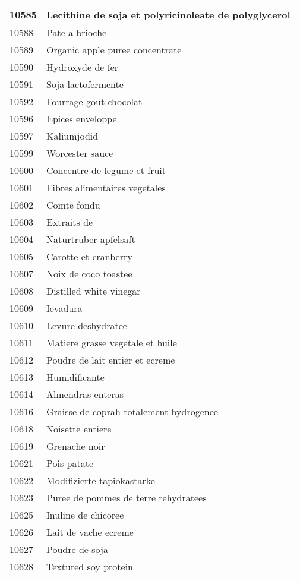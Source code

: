 \begin{longtable}{|l|l|}
10585 & Lecithine de soja et polyricinoleate de polyglycerol \\ \hline 
10588 & Pate a brioche \\ \hline 
10589 & Organic apple puree concentrate \\ \hline 
10590 & Hydroxyde de fer \\ \hline 
10591 & Soja lactofermente \\ \hline 
10592 & Fourrage gout chocolat \\ \hline 
10596 & Epices enveloppe \\ \hline 
10597 & Kaliumjodid \\ \hline 
10599 & Worcester sauce \\ \hline 
10600 & Concentre de legume et fruit \\ \hline 
10601 & Fibres alimentaires vegetales \\ \hline 
10602 & Comte fondu \\ \hline 
10603 & Extraits de \\ \hline 
10604 & Naturtruber apfelsaft \\ \hline 
10605 & Carotte et cranberry \\ \hline 
10607 & Noix de coco toastee \\ \hline 
10608 & Distilled white vinegar \\ \hline 
10609 & Ievadura \\ \hline 
10610 & Levure deshydratee \\ \hline 
10611 & Matiere grasse vegetale et huile \\ \hline 
10612 & Poudre de lait entier et ecreme \\ \hline 
10613 & Humidificante \\ \hline 
10614 & Almendras enteras \\ \hline 
10616 & Graisse de coprah totalement hydrogenee \\ \hline 
10618 & Noisette entiere \\ \hline 
10619 & Grenache noir \\ \hline 
10621 & Pois patate \\ \hline 
10622 & Modifizierte tapiokastarke \\ \hline 
10623 & Puree de pommes de terre rehydratees \\ \hline 
10625 & Inuline de chicoree \\ \hline 
10626 & Lait de vache ecreme \\ \hline 
10627 & Poudre de soja \\ \hline 
10628 & Textured soy protein \\ \hline 

\end{longtable}
